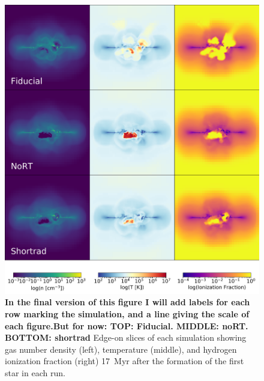 \documentclass[twocolumn]{aastex62}
\begin{document}
{\begin{figure}
\centering
\includegraphics[width=0.99\linewidth]{DD0136_fiducial_shortrad_nort}
\caption{\textbf{In the final version of this figure I will add labels for each row marking the simulation, and a line giving the scale of each figure.But for now: TOP: Fiducial. MIDDLE: noRT. BOTTOM: shortrad} Edge-on slices of each simulation showing gas number density (left), temperature (middle), and hydrogen ionization fraction (right) 17~Myr after the formation of the first star in each run.}
\label{fig:panel1}
\end{figure}

}
\end{document}
